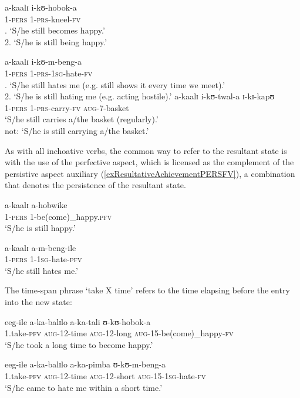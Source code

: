 \begin{exe}
\ex \label{exResultativeAchievementPERSPRS}
\begin{xlist}
\ex\gll a-kaalɪ i-kʊ-hobok-a\\
1-\textsc{pers} 1-\textsc{prs}-kneel-\textsc{fv}\\
. \lq S/he still becomes happy.'\\
2. \lq  S/he is still being happy.'

\ex\gll a-kaalɪ i-kʊ-m-beng-a\\
1-\textsc{pers} 1-\textsc{prs}-\textsc{1sg}-hate-\textsc{fv}\\
. \lq S/he still hates me (e.g. still shows it every time we meet).'\\
2. \lq  S/he is still hating me (e.g. acting hostile).'
\ex \gll a-kaalɪ i-kʊ-twal-a ɪ-kɪ-kapʊ\\
1-\textsc{pers} 1-\textsc{prs}-carry-\textsc{fv} \textsc{aug}-7-basket\\
\glt \lq S/he still carries a/the basket (regularly).'\\
not: \lq S/he is still carrying a/the basket.'
\end{xlist}
\end{exe}

As with all inchoative verbs, the common way to refer to the resultant state is with the use of the perfective aspect, which is licensed as the complement of the persistive aspect auxiliary (\ref{exResultativeAchievementPERSFV}), a combination that denotes the persistence of the resultant state.
\begin{exe}
\ex \label{exResultativeAchievementPERSFV}\begin{xlist}
\ex\gll a-kaalɪ a-hobwike\\
1-\textsc{pers} 1-be(come)\_happy.\textsc{pfv}\\
\glt `S/he is still happy.'

\ex \gll a-kaalɪ a-m-beng-ile\\
1-\textsc{pers} 1-\textsc{1sg}-hate-\textsc{pfv}\\
\glt \lq S/he still hates me.'
\end{xlist}
\end{exe}

The time-span phrase \lq take X time' refers to the time elapsing before the entry into the new state:

\begin{exe}
\ex \begin{xlist}
\ex \gll eeg-ile a-ka-balɪlo a-ka-tali ʊ-kʊ-hobok-a\\
1.take-\textsc{pfv} \textsc{aug}-12-time \textsc{aug}-12-long \textsc{aug}-15-be(come)\_happy-\textsc{fv}\\
\glt \lq S/he took a long time to become happy.'

\ex \gll eeg-ile a-ka-balɪlo a-ka-pimba ʊ-kʊ-m-beng-a\\
1.take-\textsc{pfv} \textsc{aug}-12-time \textsc{aug}-12-short \textsc{aug}-15-\textsc{1sg}-hate-\textsc{fv}\\
\glt \lq S/he came to hate me within a short time.'
\end{xlist}
\end{exe}

